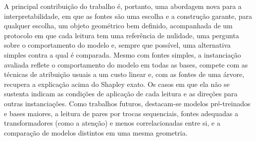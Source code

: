 A principal contribuição do trabalho é, portanto, uma abordagem nova para a interpretabilidade, em que as fontes são uma escolha e a construção garante, para qualquer escolha, um objeto geométrico bem definido, acompanhada de um protocolo em que cada leitura tem uma referência de nulidade, uma pergunta sobre o comportamento do modelo e, sempre que possível, uma alternativa simples contra a qual é comparada. Mesmo com fontes simples, a instanciação avaliada reflete o comportamento do modelo em todas as bases, compete com as técnicas de atribuição usuais a um custo linear e, com as fontes de uma árvore, recupera a explicação acima do Shapley exato. Os casos em que ela não se sustenta indicam as condições de aplicação de cada leitura e as direções para outras instanciações. Como trabalhos futuros, destacam-se modelos pré-treinados e bases maiores, a leitura de pares por trocas sequenciais, fontes adequadas a transformadores (como a atenção) e menos correlacionadas entre si, e a comparação de modelos distintos em uma mesma geometria.
